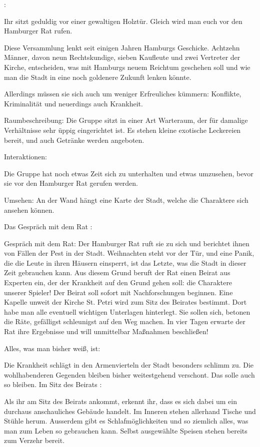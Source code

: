 
:

Ihr sitzt geduldig vor einer gewaltigen Holztür. Gleich wird man euch vor den Hamburger Rat rufen.

Diese Versammlung lenkt seit einigen Jahren Hamburgs Geschicke. Achtzehn Männer, davon neun Rechtskundige, sieben Kaufleute und zwei Vertreter der Kirche, entscheiden, was mit Hamburgs neuem Reichtum geschehen soll und wie man die Stadt in eine noch goldenere Zukunft lenken könnte.

Allerdings müssen sie sich auch um weniger Erfreuliches kümmern: Konflikte, Kriminalität und neuerdings auch Krankheit.

Raumbeschreibung: Die Gruppe sitzt in einer Art Warteraum, der für damalige Verhältnisse sehr üppig eingerichtet ist. Es stehen kleine exotische Leckereien bereit, und auch Getränke werden angeboten.

Interaktionen:

Die Gruppe hat noch etwas Zeit sich zu unterhalten und etwas umzusehen, bevor sie vor den Hamburger Rat gerufen werden.

Umsehen: An der Wand hängt eine Karte der Stadt, welche die Charaktere sich ansehen können.


Das Gespräch mit dem Rat
:

Gespräch mit dem Rat: Der Hamburger Rat ruft sie zu sich und berichtet ihnen von Fällen der Pest in der Stadt. Weihnachten steht vor der Tür, und eine Panik, die die Leute in ihren Häusern einsperrt, ist das Letzte, was die Stadt in dieser Zeit gebrauchen kann. Aus diesem Grund beruft der Rat einen Beirat aus Experten ein, der der Krankheit auf den Grund gehen soll: die Charaktere unserer Spieler! Der Beirat soll sofort mit Nachforschungen beginnen. Eine Kapelle unweit der Kirche St. Petri wird zum Sitz des Beirates bestimmt. Dort habe man alle eventuell wichtigen Unterlagen hinterlegt. Sie sollen sich, betonen die Räte, gefälligst schleunigst auf den Weg machen. In vier Tagen erwarte der Rat ihre Ergebnisse und will unmittelbar Maßnahmen beschließen!

Alles, was man bisher weiß, ist:

Die Krankheit schlägt in den Armenvierteln der Stadt besonders schlimm zu.
Die wohlhabenderen Gegenden bleiben bisher weitestgehend verschont. Das solle auch so bleiben.
Im Sitz des Beirats
:

Als ihr am Sitz des Beirats ankommt, erkennt ihr, dass es sich dabei um ein durchaus anschauliches Gebäude handelt. Im Inneren stehen allerhand Tische und Stühle herum. Ausserdem gibt es Schlafmöglichkeiten und so ziemlich alles, was man zum Leben so gebrauchen kann. Selbst ausgewählte Speisen stehen bereits zum Verzehr bereit.

